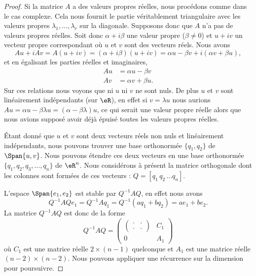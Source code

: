 \begin{proof}
	Si la matrice \( A\) a des valeurs propres réelles, nous procédons comme dans le cas complexe. Cela nous fournit le partie véritablement triangulaire avec les valeurs propres \( \lambda_1,\ldots, \lambda_r\) sur la diagonale. Supposons donc que \( A\) n'a pas de valeurs propres réelles. Soit donc \( \alpha+i\beta \) une valeur propre (\( \beta\neq 0\)) et \( u+iv\) un vecteur propre correspondant où \( u\) et \( v\) sont des vecteurs réels. Nous avons
	\begin{equation}
		Au+iAv=A(u+iv)=(\alpha+i\beta)(u+iv)=\alpha u-\beta v+i(\alpha v+\beta u),
	\end{equation}
	et en égalisant les parties réelles et imaginaires,
	\begin{subequations}
		\begin{align}
			Au & =\alpha u-\beta v  \\
			Av & =\alpha v+\beta u.
		\end{align}
	\end{subequations}
	Sur ces relations nous voyons que ni \( u\) ni \( v\) ne sont nuls. De plus \( u\) et \( v\) sont linéairement indépendants (sur \( \eR\)), en effet si \( v=\lambda u\) nous aurions \( Au=\alpha u-\beta\lambda u=(\alpha-\beta\lambda)u\), ce qui serait une valeur propre réelle alors que nous avions supposé avoir déjà épuisé toutes les valeurs propres réelles.

	Étant donné que \( u\) et \( v\) sont deux vecteurs réels non nuls et linéairement indépendants, nous pouvons trouver une base orthonormée \( \{ q_1,q_2 \}\) de \( \Span\{ u,v \}\). Nous pouvons étendre ces deux vecteurs en une base orthonormée \( \{ q_1,q_2,q_3,\ldots, q_n \}\) de \( \eR^n\). Nous considérons à présent la matrice orthogonale dont les colonnes sont formées de ces vecteurs : \( Q=[q_1\,q_2\,\ldots q_n]\).

	L'espace \( \Span\{ e_1,e_2 \}\) est stable par \( Q^{-1} AQ\), en effet nous avons
	\begin{equation}
		Q^{-1} AQe_1=Q^{-1} Aq_1=Q^{-1}(aq_1+bq_2)=ae_1+be_2.
	\end{equation}
	La matrice \( Q^{-1}AQ\) est donc de la forme
	\begin{equation}
		Q^{-1} AQ=\begin{pmatrix}
			\begin{pmatrix}
				\cdot & \cdot \\
				\cdot & \cdot
			\end{pmatrix} & C_1    \\
			0                & A_1
		\end{pmatrix}
	\end{equation}
	où \( C_1\) est une matrice réelle \( 2\times (n-1)\) quelconque et \( A_1\) est une matrice réelle \( (n-2)\times (n-2)\). Nous pouvons appliquer une récurrence sur la dimension pour poursuivre.


\end{proof}
